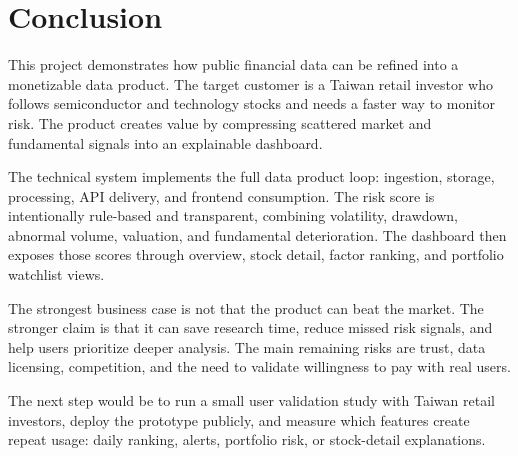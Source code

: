 \section{Conclusion}
\label{sec:conclusion}

This project demonstrates how public financial data can be refined into a monetizable data product. The target customer is a Taiwan retail investor who follows semiconductor and technology stocks and needs a faster way to monitor risk. The product creates value by compressing scattered market and fundamental signals into an explainable dashboard.

The technical system implements the full data product loop: ingestion, storage, processing, API delivery, and frontend consumption. The risk score is intentionally rule-based and transparent, combining volatility, drawdown, abnormal volume, valuation, and fundamental deterioration. The dashboard then exposes those scores through overview, stock detail, factor ranking, and portfolio watchlist views.

The strongest business case is not that the product can beat the market. The stronger claim is that it can save research time, reduce missed risk signals, and help users prioritize deeper analysis. The main remaining risks are trust, data licensing, competition, and the need to validate willingness to pay with real users.

The next step would be to run a small user validation study with Taiwan retail investors, deploy the prototype publicly, and measure which features create repeat usage: daily ranking, alerts, portfolio risk, or stock-detail explanations.
